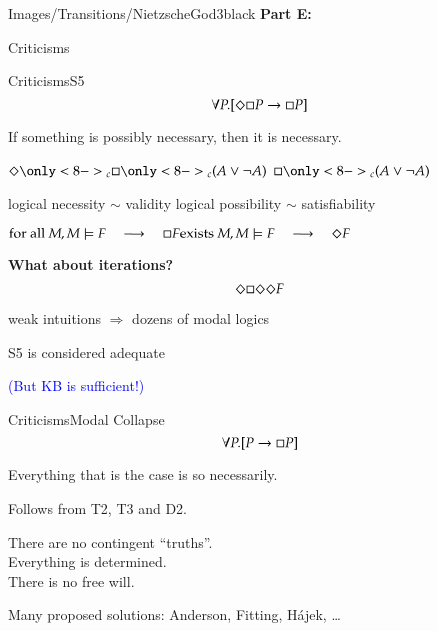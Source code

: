 \begin{transitionframe}{Images/Transitions/NietzscheGod3}{black}
\textbf{Part E:}

Criticisms
\end{transitionframe}

\begin{frame}{Criticisms}{S5} \centering
$$
\forall P.[ \Diamond \Box P \rightarrow \Box P ] 
$$

\medskip

If something is possibly necessary, then it is necessary.

\pause

\bigskip


$
\pos\only<8->{_c} \nec\only<8->{_c} (A \vee \neg A)
$
\pause
\qquad 
$
\nec\only<8->{_c} (A \vee \neg A)
$

\pause

\bigskip

logical necessity $\sim$ validity
\hfill
logical possibility $\sim$ satisfiability

\pause 

\medskip

$ 
\textrm{for all } M, M \models F 
\quad \longrightarrow \quad
\nec F
\hfill
\textrm{exists } M, M \models F 
\quad \longrightarrow \quad
\pos F
$

\pause

\bigskip

\textbf{What about iterations?}
$$
\Diamond \Box \Diamond \Diamond F
$$

\medskip

\pause

weak intuitions $\Rightarrow$ dozens of modal logics

\medskip

\pause

\alert{S5 is considered adequate}

\medskip

\pause

\textcolor{blue}{(But KB is sufficient!)}


\end{frame}


\begin{frame}{Criticisms}{Modal Collapse} \centering
$$
\forall P.[ P \rightarrow \Box P ] 
$$

\medskip

Everything that is the case is so necessarily.

\pause

\medskip

Follows from T2, T3 and D2.

\pause

\medskip

There are no contingent ``truths''. \\ \pause
Everything is determined. \\ \pause
There is no free will. \\ \pause


\pause
\bigskip

Many proposed solutions: Anderson, Fitting, H\'ajek, \ldots
 
\end{frame}


